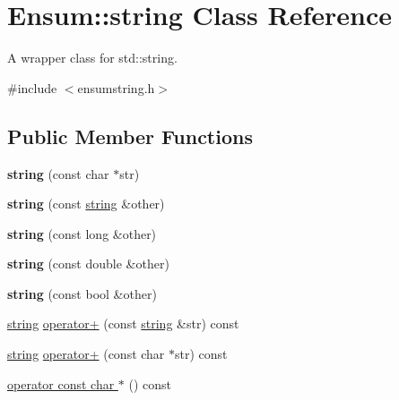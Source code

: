 \hypertarget{class_ensum_1_1string}{}\section{Ensum\+:\+:string Class Reference}
\label{class_ensum_1_1string}


A wrapper class for std\+::string.  




{\ttfamily \#include $<$ensumstring.\+h$>$}

\subsection*{Public Member Functions}
\begin{DoxyCompactItemize}
\item 
{\bfseries string} (const char $\ast$str)\hypertarget{class_ensum_1_1string_a1efde732b942cf5b4a9aeff02836c7f4}{}\label{class_ensum_1_1string_a1efde732b942cf5b4a9aeff02836c7f4}

\item 
{\bfseries string} (const \hyperlink{class_ensum_1_1string}{string} \&other)\hypertarget{class_ensum_1_1string_a941a6aeb4f7e6f8a61a375a19ada9e36}{}\label{class_ensum_1_1string_a941a6aeb4f7e6f8a61a375a19ada9e36}

\item 
{\bfseries string} (const long \&other)\hypertarget{class_ensum_1_1string_ab94e9717ef713acd5981ad9d2c9d0a5e}{}\label{class_ensum_1_1string_ab94e9717ef713acd5981ad9d2c9d0a5e}

\item 
{\bfseries string} (const double \&other)\hypertarget{class_ensum_1_1string_ad2d7d12b303783eb4ecc32a389e1c42b}{}\label{class_ensum_1_1string_ad2d7d12b303783eb4ecc32a389e1c42b}

\item 
{\bfseries string} (const bool \&other)\hypertarget{class_ensum_1_1string_a82ccf9bec24664a575b8e9c70cbd7d99}{}\label{class_ensum_1_1string_a82ccf9bec24664a575b8e9c70cbd7d99}

\item 
\hyperlink{class_ensum_1_1string}{string} \hyperlink{class_ensum_1_1string_a13098a5e0f0fd18baeffa5bc8b35494d}{operator+} (const \hyperlink{class_ensum_1_1string}{string} \&str) const 
\item 
\hyperlink{class_ensum_1_1string}{string} \hyperlink{class_ensum_1_1string_aa9f884ae697a27d375d6dc71fd5a1602}{operator+} (const char $\ast$str) const 
\item 
\hyperlink{class_ensum_1_1string_ae1473c4afee1fb83de48490a72f8266b}{operator const char $\ast$} () const \hypertarget{class_ensum_1_1string_ae1473c4afee1fb83de48490a72f8266b}{}\label{class_ensum_1_1string_ae1473c4afee1fb83de48490a72f8266b}


\end{DoxyCompactItemize}
